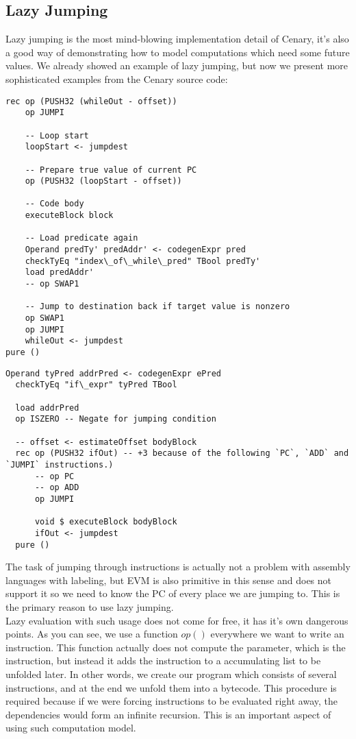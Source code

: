 \documentclass{article}
\begin{document}
\subsection{Lazy Jumping}
\label{lazy_jumping}
Lazy jumping is the most mind-blowing implementation detail of Cenary, it's also a good way of demonstrating how to model computations which need some future values. We already showed an example of lazy jumping, but now we present more sophisticated examples from the Cenary source code:
\begin{lstlisting}[label=lazy_while,caption=Lazily Jumped While Loop]
rec op (PUSH32 (whileOut - offset))
    op JUMPI

    -- Loop start
    loopStart <- jumpdest

    -- Prepare true value of current PC
    op (PUSH32 (loopStart - offset))

    -- Code body
    executeBlock block

    -- Load predicate again
    Operand predTy' predAddr' <- codegenExpr pred
    checkTyEq "index\_of\_while\_pred" TBool predTy'
    load predAddr'
    -- op SWAP1

    -- Jump to destination back if target value is nonzero
    op SWAP1
    op JUMPI
    whileOut <- jumpdest
pure ()
\end{lstlisting}
\begin{lstlisting}[label=lazy_if,caption=Lazily Jumped If Statement]
  Operand tyPred addrPred <- codegenExpr ePred
  checkTyEq "if\_expr" tyPred TBool

  load addrPred
  op ISZERO -- Negate for jumping condition

  -- offset <- estimateOffset bodyBlock
  rec op (PUSH32 ifOut) -- +3 because of the following `PC`, `ADD` and `JUMPI` instructions.)
      -- op PC
      -- op ADD
      op JUMPI

      void $ executeBlock bodyBlock
      ifOut <- jumpdest
  pure ()
\end{lstlisting}

The task of jumping through instructions is actually not a problem with assembly languages with labeling, but EVM is also primitive in this sense and does not support it so we need to know the PC of every place we are jumping to. This is the primary reason to use lazy jumping. \\

Lazy evaluation with such usage does not come for free, it has it's own dangerous points. As you can see, we use a function $op()$ everywhere we want to write an instruction. This function actually does not compute the parameter, which is the instruction, but instead it adds the instruction to a accumulating list to be unfolded later. In other words, we create our program which consists of several instructions, and at the end we unfold them into a bytecode. This procedure is required because if we were forcing instructions to be evaluated right away, the dependencies would form an infinite recursion. This is an important aspect of using such computation model.
\end{document}
